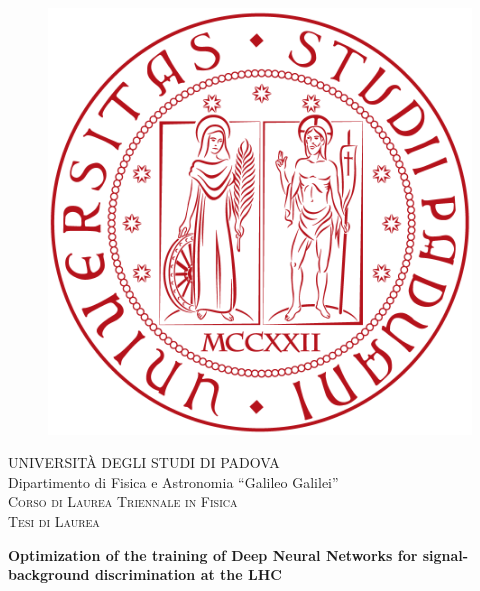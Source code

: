 \begin{titlepage}
 \begin{addmargin}[-1cm]{-3cm}
  
  \vspace{5mm}
  \begin{figure}[hbtp]
   \centering
   \hspace{20mm}
   \includegraphics[scale=.13]{figures/UNIPD.png}
  \end{figure}
  \vspace{5mm}
  \begin{center}
   {{\huge{\textsc{ UNIVERSIT\`A DEGLI STUDI DI PADOVA}}}\\}
   \vspace{5mm}
   {\Large{ Dipartimento di Fisica e Astronomia ``Galileo Galilei''}} \\
   \vspace{5mm}
   {\Large{\textsc{ Corso di Laurea Triennale in Fisica}}}\\
   \vspace{14mm}
   {\Large{\textsc{ Tesi di Laurea}}}\\
   \vspace{16mm}
   \begin{spacing}{3}
    {\huge \textbf{Optimization of the training of Deep Neural Networks for signal-background discrimination at the LHC}}\\
   \end{spacing}
   \vspace{3mm}
  \end{center}
  

\end{addmargin}
\end{titlepage}
